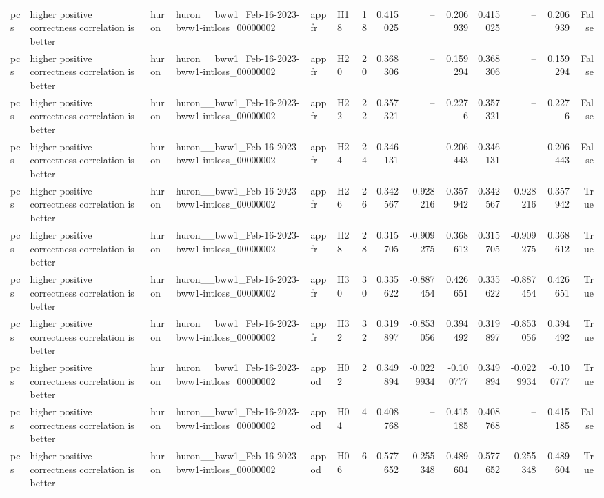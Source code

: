 \begin{longtable}{llllllrrrrrrrr}
pcs & higher positive correctness correlation is better & huron & huron\_\_bww1\_Feb-16-2023-bww1-intloss\_00000002 & appfr & H18 & 18 & 0.415025 & -- & 0.206939 & 0.415025 & -- & 0.206939 & False \\
pcs & higher positive correctness correlation is better & huron & huron\_\_bww1\_Feb-16-2023-bww1-intloss\_00000002 & appfr & H20 & 20 & 0.368306 & -- & 0.159294 & 0.368306 & -- & 0.159294 & False \\
pcs & higher positive correctness correlation is better & huron & huron\_\_bww1\_Feb-16-2023-bww1-intloss\_00000002 & appfr & H22 & 22 & 0.357321 & -- & 0.2276 & 0.357321 & -- & 0.2276 & False \\
pcs & higher positive correctness correlation is better & huron & huron\_\_bww1\_Feb-16-2023-bww1-intloss\_00000002 & appfr & H24 & 24 & 0.346131 & -- & 0.206443 & 0.346131 & -- & 0.206443 & False \\
pcs & higher positive correctness correlation is better & huron & huron\_\_bww1\_Feb-16-2023-bww1-intloss\_00000002 & appfr & H26 & 26 & 0.342567 & -0.928216 & 0.357942 & 0.342567 & -0.928216 & 0.357942 & True \\
pcs & higher positive correctness correlation is better & huron & huron\_\_bww1\_Feb-16-2023-bww1-intloss\_00000002 & appfr & H28 & 28 & 0.315705 & -0.909275 & 0.368612 & 0.315705 & -0.909275 & 0.368612 & True \\
pcs & higher positive correctness correlation is better & huron & huron\_\_bww1\_Feb-16-2023-bww1-intloss\_00000002 & appfr & H30 & 30 & 0.335622 & -0.887454 & 0.426651 & 0.335622 & -0.887454 & 0.426651 & True \\
pcs & higher positive correctness correlation is better & huron & huron\_\_bww1\_Feb-16-2023-bww1-intloss\_00000002 & appfr & H32 & 32 & 0.319897 & -0.853056 & 0.394492 & 0.319897 & -0.853056 & 0.394492 & True \\
pcs & higher positive correctness correlation is better & huron & huron\_\_bww1\_Feb-16-2023-bww1-intloss\_00000002 & appod & H02 & 2 & 0.349894 & -0.0229934 & -0.100777 & 0.349894 & -0.0229934 & -0.100777 & True \\
pcs & higher positive correctness correlation is better & huron & huron\_\_bww1\_Feb-16-2023-bww1-intloss\_00000002 & appod & H04 & 4 & 0.408768 & -- & 0.415185 & 0.408768 & -- & 0.415185 & False \\
pcs & higher positive correctness correlation is better & huron & huron\_\_bww1\_Feb-16-2023-bww1-intloss\_00000002 & appod & H06 & 6 & 0.577652 & -0.255348 & 0.489604 & 0.577652 & -0.255348 & 0.489604 & True \\

\end{longtable}

